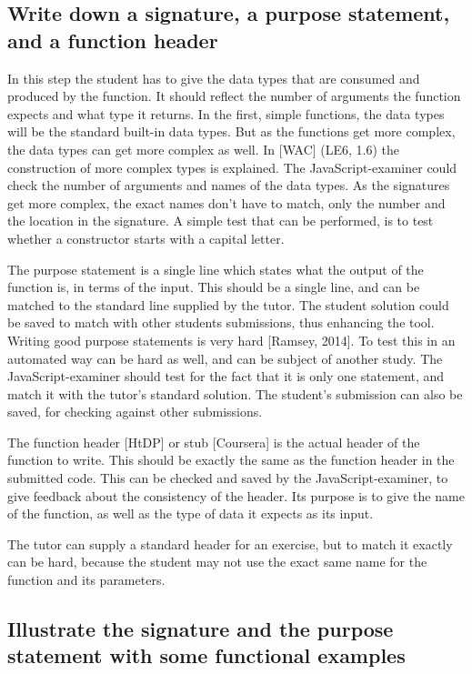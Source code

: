 \documentclass{article}
\begin{document}
\subsection{Write down a signature, a purpose statement, and a function header}
In this step the student has to give the data types that are consumed and produced
by the function.
It should reflect the number of arguments the function expects and what type it
returns.
In the first, simple functions, the data types will be the standard built-in
data types. But as the functions get more complex, the data types can get more
complex as well.
In [WAC] (LE6, 1.6) the construction of more complex types is explained.
The JavaScript-examiner could check the number of arguments and names of the
data types. As the signatures get more complex, the exact names don't have to
match, only the number and the location in the signature. A simple test that
can be performed, is to test whether a constructor starts with a capital letter.

The purpose statement is a single line which states what the output of the
function is, in terms of the input. This should be a single line, and can be
matched to the standard line supplied by the tutor.
The student solution could be saved to match with other students submissions,
thus enhancing the tool.
Writing good purpose statements is very hard [Ramsey, 2014].
To test this in an automated way can be hard as well, and can be subject of
another study. The JavaScript-examiner should test for the fact that it is only
one statement, and match it with the tutor's standard solution. The student's
submission can also be saved, for checking against other submissions.


The function header [HtDP] or stub [Coursera] is the actual header of the
function to write. This should be exactly the same as the function header in the
submitted code.
This can be checked and saved by the JavaScript-examiner, to give feedback about
the consistency of the header.
Its purpose is to give the name of the function, as well as the type of data it
expects as its input.

The tutor can supply a standard header for an exercise, but to match it exactly
can be hard, because the student may not use the exact same name for the
function and its parameters.


\subsection{Illustrate the signature and the purpose statement with some functional examples}
\end{document}
